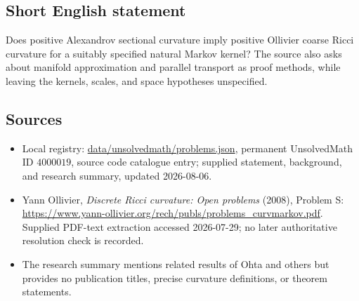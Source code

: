 \documentclass[11pt]{article}
\begin{document}
\subsection{Short English statement}
Does positive Alexandrov sectional curvature imply positive Ollivier coarse Ricci curvature for a suitably specified natural Markov kernel? The source also asks about manifold approximation and parallel transport as proof methods, while leaving the kernels, scales, and space hypotheses unspecified.
\subsection{Sources}
\begin{itemize}
\item Local registry: \url{data/unsolvedmath/problems.json}, permanent UnsolvedMath ID \(4000019\), source code catalogue entry; supplied statement, background, and research summary, updated 2026-08-06.
\item Yann Ollivier, \emph{Discrete Ricci curvature: Open problems} (2008), Problem S: \url{https://www.yann-ollivier.org/rech/publs/problems_curvmarkov.pdf}. Supplied PDF-text extraction accessed 2026-07-29; no later authoritative resolution check is recorded.
\item The research summary mentions related results of Ohta and others but provides no publication titles, precise curvature definitions, or theorem statements.
\end{itemize}
\end{document}
